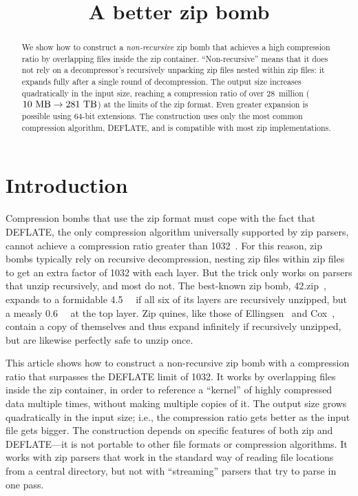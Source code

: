 \documentclass[letterpaper,twocolumn,10pt]{article}
\newcommand{\MB}{\mega\byte}
\newcommand{\TB}{\tera\byte}
\newcommand{\PB}{\peta\byte}
\begin{document}
\date{}

\title{\Large \bf A better zip bomb}

\author{
}

\maketitle

\begin{abstract}
We show how to construct a
\emph{non-recursive} zip bomb
that achieves a high compression ratio by
overlapping files inside the zip container.
``Non-recursive'' means that it does not rely on
a decompressor's recursively unpacking zip files nested within zip files:
it expands fully after a single round of decompression.
The output size increases quadratically in the input size,
reaching a compression ratio of over 28~million
($\SI{10}{\MB} \rightarrow \SI{281}{\TB}$)
at the limits of the zip format.
Even greater expansion is possible using
64-bit extensions.
The construction uses only the most common compression algorithm, DEFLATE,
and is compatible with most zip implementations.
\end{abstract}


\section{Introduction}

Compression bombs that use the zip format
must cope with the fact that DEFLATE,
the only compression algorithm universally supported by zip parsers,
cannot achieve a compression ratio greater than
\num{1032}~\cite{zlib_tech}.
For this reason, zip bombs typically rely on recursive decompression,
nesting zip files within zip files to get an extra factor of 1032 with each layer.
But the trick only works on parsers that
unzip recursively, and most do not.
The best-known zip bomb, 42.zip~\cite{42.zip},
expands to a formidable \SI{4.5}{\PB}
if all six of its layers are recursively unzipped,
but a measly \SI{0.6}{\MB} at the top layer.
Zip quines, like those of
Ellingsen~\cite{ellingsen}
and Cox~\cite{cox},
contain a copy of themselves
and thus expand infinitely if recursively unzipped,
but are likewise perfectly safe to unzip once.

This article shows how to construct a non-recursive zip bomb
with a compression ratio that surpasses the DEFLATE limit of 1032.
It works by overlapping files inside the zip container,
in order to reference a ``kernel'' of highly compressed data multiple times,
without making multiple copies of it.
The output size grows quadratically in the input size; i.e.,
the compression ratio gets better as the input file gets bigger.
The construction depends on specific features of both zip and DEFLATE---it
is not portable to other file formats or compression algorithms.
It works with zip parsers that work in the standard way
of reading file locations from a central directory,
but not with ``streaming'' parsers that try to parse in one pass.
\end{document}
